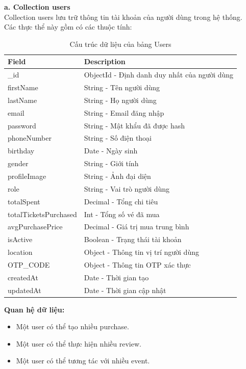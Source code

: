 \textbf{a. Collection users} \\
Collection users lưu trữ thông tin tài khoản của người dùng trong hệ thống.\\
Các thực thể này gồm có các thuộc tính:
\setlength{\LTleft}{0pt}
\setlength{\LTright}{0pt}
\begin{longtable}{|p{4cm}|p{11.2cm}|}
\caption{Cấu trúc dữ liệu của bảng Users}\\[15pt]
\hline
\textbf{Field} & \textbf{Description} \\ \hline
\_id & ObjectId - Định danh duy nhất của người dùng \\ \hline
firstName & String - Tên người dùng \\ \hline
lastName & String - Họ người dùng \\ \hline
email & String - Email đăng nhập \\ \hline
password & String - Mật khẩu đã được hash \\ \hline
phoneNumber & String - Số điện thoại \\ \hline
birthday & Date - Ngày sinh \\ \hline
gender & String - Giới tính \\ \hline
profileImage & String - Ảnh đại diện \\ \hline
role & String - Vai trò người dùng \\ \hline
totalSpent & Decimal - Tổng chi tiêu \\ \hline
totalTicketsPurchased & Int - Tổng số vé đã mua \\ \hline
avgPurchasePrice & Decimal - Giá trị mua trung bình \\ \hline
isActive & Boolean - Trạng thái tài khoản \\ \hline
location & Object - Thông tin vị trí người dùng \\ \hline
OTP\_CODE & Object - Thông tin OTP xác thực \\ \hline
createdAt & Date - Thời gian tạo \\ \hline
updatedAt & Date - Thời gian cập nhật \\ \hline
\end{longtable}
\textbf{Quan hệ dữ liệu:}
\begin{itemize}
    \item[-] Một user có thể tạo nhiều purchase.
    \item[-] Một user có thể thực hiện nhiều review.
    \item[-] Một user có thể tương tác với nhiều event.
\end{itemize}

